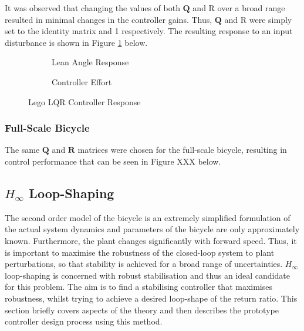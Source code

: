 It was observed that changing the values of both $\mathbf{Q}$ and R over a broad range resulted in minimal changes in the controller gains. Thus, $\mathbf{Q}$ and R were simply set to the identity matrix and 1 respectively. The resulting response to an input disturbance is shown in Figure \ref{fig:lqrLego} below.

\begin{figure}[H]
	\begin{subfigure}{0.5\textwidth}
	\caption{Lean Angle Response}
	\end{subfigure} \hspace{1mm}
	\begin{subfigure}{0.5\textwidth}
	\caption{Controller Effort}
	\end{subfigure}
	\caption{Lego LQR Controller Response}
	\label{fig:lqrLego}
\end{figure}

\subsubsection{Full-Scale Bicycle}
The same $\mathbf{Q}$ and $\mathbf{R}$ matrices were chosen for the full-scale bicycle, resulting in control performance that can be seen in Figure XXX below.

\subsection{$H_{\infty}$ Loop-Shaping}
The second order model of the bicycle is an extremely simplified formulation of the actual system dynamics and parameters of the bicycle are only approximately known. Furthermore, the plant changes significantly with forward speed. Thus, it is important to maximise the robustness of the closed-loop system to plant perturbations, so that stability is achieved for a broad range of uncertainties. $H_{\infty}$ loop-shaping is concerned with robust stabilisation and thus an ideal candidate for this problem. The aim is to find a stabilising controller that maximises robustness, whilst trying to achieve a desired loop-shape of the return ratio. This section briefly covers aspects of the theory and then describes the prototype controller design process using this method. \\

